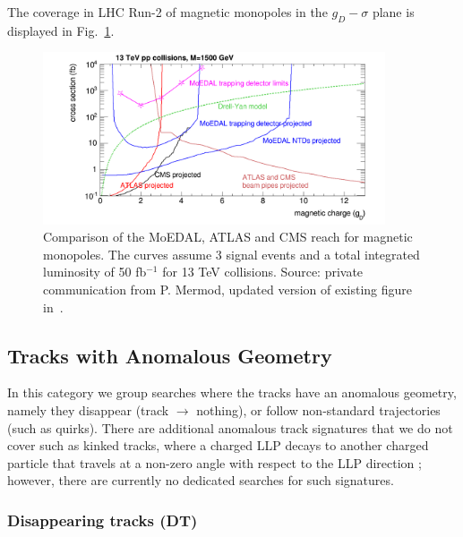 The coverage in LHC Run-2 of magnetic monopoles in the $g_D-\sigma$ plane is displayed in Fig.~\ref{fig:magnetic_monopole_reach}.
%
\begin{figure}[htb]
\centering
\includegraphics[width=0.9\textwidth]{plots/monopoles_xsec_13TeV_3events}
\caption{Comparison of the MoEDAL, ATLAS and CMS reach for magnetic monopoles. The curves assume 3 signal events and a total integrated luminosity of 50 fb$^{-1}$ for 13 TeV collisions. Source: private communication from P. Mermod, updated version of existing figure in~\cite{DeRoeck:2011aa}.}
\label{fig:magnetic_monopole_reach}
\end{figure}




\subsection{Tracks with Anomalous Geometry}


In this category we group searches where the tracks have an anomalous geometry, namely they disappear (track $\to$ nothing), or follow non-standard trajectories (such as quirks). There are additional anomalous track signatures that we do not cover such as kinked tracks, where a charged LLP decays to another charged particle that travels at a non-zero angle with respect to the LLP direction \cite{Dimopoulos:1996vz,Hamaguchi:2004df,Asai:2011wy,Jung:2015boa}; however, there are currently no dedicated searches for such signatures.

\subsubsection*{Disappearing tracks (DT)} 

